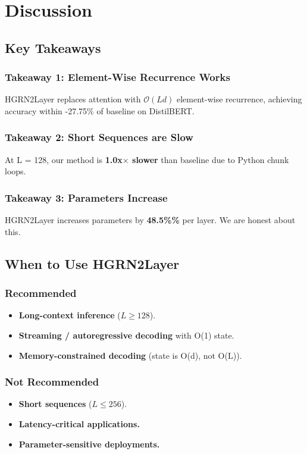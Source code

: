 \section{Discussion}

\subsection{Key Takeaways}

\subsubsection{Takeaway 1: Element-Wise Recurrence Works}

HGRN2Layer replaces attention with $\mathcal{O}(L d)$ element-wise recurrence, 
achieving accuracy within -27.75\% of baseline on DistilBERT.

\subsubsection{Takeaway 2: Short Sequences are Slow}

At L = 128, our method is \textbf{1.0x$\times$ slower} than baseline due to Python 
chunk loops.

\subsubsection{Takeaway 3: Parameters Increase}

HGRN2Layer increases parameters by \textbf{48.5\%\%} per layer. We are 
honest about this.

\subsection{When to Use HGRN2Layer}

\subsubsection{Recommended}
\begin{itemize}
\item \textbf{Long-context inference} ($L \geq 128$).
\item \textbf{Streaming / autoregressive decoding} with O(1) state.
\item \textbf{Memory-constrained decoding} (state is O(d), not O(L)).

\end{itemize}
\subsubsection{Not Recommended}
\begin{itemize}
\item \textbf{Short sequences} ($L \leq 256$).
\item \textbf{Latency-critical applications.}
\item \textbf{Parameter-sensitive deployments.}

\end{itemize}
